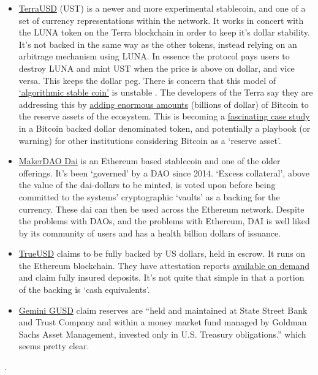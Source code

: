 \begin{itemize}
\item \href{https://assets.website-files.com/611153e7af981472d8da199c/618b02d13e938ae1f8ad1e45_Terra_White_paper.pdf}{TerraUSD} (UST) is a newer and more experimental stablecoin, and one of a set of currency representations within the network. It works in concert with the LUNA token on the Terra blockchain in order to keep it's dollar stability. It's not backed in the same way as the other tokens, instead relying on an arbitrage mechanism using LUNA. In essence the protocol pays users to destroy LUNA and mint UST when the price is above on dollar, and vice versa. This keeps the dollar peg. There is concern that this model of \href{https://mirror.xyz/damsondao.eth/OVeBrmrfcWm7uKLlA2Q4W1XTVkFU3cMKfNWhgf7mQuM}{`algorithmic stable coin'} is unstable \cite{clements2021built}. The developers of the Terra say they are addressing this by \href{https://etherscan.io/address/0xad41bd1cf3fd753017ef5c0da8df31a3074ea1ea}{adding enormous amounts} (billions of dollar) of Bitcoin to the reserve assets of the ecosystem. This is becoming a \href{https://murrayrudd.substack.com/p/luna-price-model-update-22-feb-2022?s=r}{fascinating case study} in a Bitcoin backed dollar denominated token, and potentially a playbook (or warning) for other institutions considering Bitcoin as a `reserve asset'.   
\item \href{https://makerdao.com/en/whitepaper#abstract}{MakerDAO Dai} is an Ethereum based stablecoin and one of the older offerings. It's been `governed' by a DAO since 2014. `Excess collateral', above the value of the dai-dollars to be minted, is voted upon before being committed to the systems' cryptographic `vaults' as a backing for the currency. These dai can then be used across the Ethereum network. Despite the problems with DAOs, and the problems with Ethereum, DAI is well liked by its community of users and has a health billion dollars of issuance.
\item \href{https://trueusd.com/pdf/TUSD_WhitePaper.pdf}{TrueUSD} claims to be fully backed by US dollars, held in escrow. It runs on the Ethereum blockchain. They have attestation reports \href{https://real-time-attest.trustexplorer.io/truecurrencies}{available on demand} and claim fully insured deposits. It's not quite that simple in that a portion of the backing is `cash equivalents'.
\item \href{https://www.gemini.com/static/dollar/gemini-dollar-whitepaper.pdf}{Gemini GUSD} claim reserves are ``held and maintained at State Street Bank and Trust Company and within a money market fund managed by Goldman Sachs Asset Management, invested only in U.S. Treasury obligations.'' which seems pretty clear.
\end{itemize}  .

